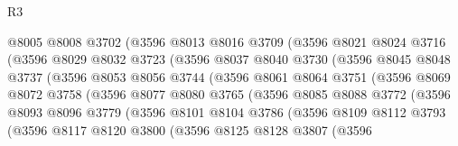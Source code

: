 \begin{lexlean}{R3}
\begin{coremodule}
                    @8005
                    @8008
                    @3702
                    (@3596
                      @8013
                      @8016
                      @3709
                      (@3596
                        @8021
                        @8024
                        @3716
                        (@3596
                          @8029
                          @8032
                          @3723
                          (@3596
                            @8037
                            @8040
                            @3730
                            (@3596
                              @8045
                              @8048
                              @3737
                              (@3596
                                @8053
                                @8056
                                @3744
                                (@3596
                                  @8061
                                  @8064
                                  @3751
                                  (@3596
                                    @8069
                                    @8072
                                    @3758
                                    (@3596
                                      @8077
                                      @8080
                                      @3765
                                      (@3596
                                        @8085
                                        @8088
                                        @3772
                                        (@3596
                                          @8093
                                          @8096
                                          @3779
                                          (@3596
                                            @8101
                                            @8104
                                            @3786
                                            (@3596
                                              @8109
                                              @8112
                                              @3793
                                              (@3596
                                                @8117
                                                @8120
                                                @3800
                                                (@3596
                                                  @8125
                                                  @8128
                                                  @3807
                                                  (@3596

\end{coremodule}
\end{lexlean}

